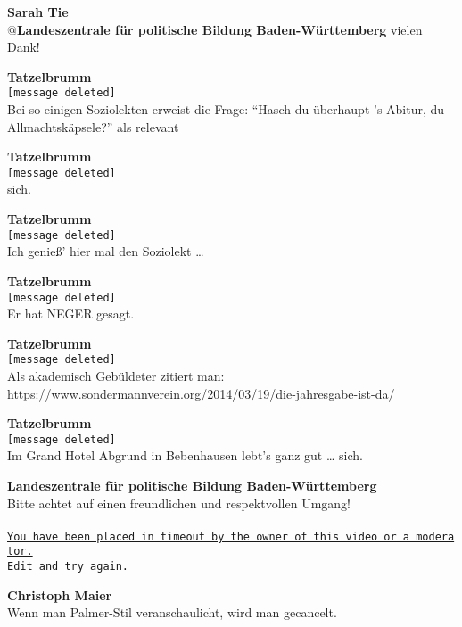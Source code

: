 \documentclass[]{article}
\let\oldparagraph\paragraph
\renewcommand{\paragraph}[1]{\oldparagraph{#1}\mbox{}}
\begin{document}
\textbf{Sarah Tie}\\
@\textbf{Landeszentrale für politische Bildung Baden-Württemberg} vielen
Dank!

\textbf{Tatzelbrumm}\\
\texttt{{[}message\ deleted{]}}\\
Bei so einigen Soziolekten\cite{soziolekt} erweist die
Frage: ``Hasch du überhaupt 's Abitur\cite{details}, du Allmachtskäpsele?''\cite{kaepsele} als relevant

\textbf{Tatzelbrumm}\\
\texttt{{[}message\ deleted{]}}\\
sich\cite{reflexivum}.

\textbf{Tatzelbrumm}\\
\texttt{{[}message\ deleted{]}}\\
Ich genieß' hier mal den Soziolekt\cite{soziolekt}
\ldots{}

\textbf{Tatzelbrumm}\\
\texttt{{[}message\ deleted{]}}\\
Er hat NEGER gesagt.\cite{neger}

\textbf{Tatzelbrumm}\\
\texttt{{[}message\ deleted{]}}\\
Als akademisch Gebüldeter zitiert man:\\
https://www.sondermannverein.org/2014/03/19/die-jahresgabe-ist-da/\cite{sondermann}

\textbf{Tatzelbrumm}\\
\texttt{{[}message\ deleted{]}}\\
Im Grand Hotel Abgrund\cite{grandhotelabgrund} in
Bebenhausen lebt's ganz gut \ldots{}
sich\cite{reflexivum}.

\textbf{Landeszentrale für politische Bildung Baden-Württemberg}\\
Bitte achtet auf einen freundlichen und respektvollen Umgang!

\paragraph{\label{timeout}}
\href{https://youtu.be/jSiCjzEgx1k?t=23}{\texttt{You\ have\ been\ placed\ in\ timeout\ by\ the\ owner\ of\ this\ video\ or\ a\ moderator.}}\\
\texttt{Edit\ and\ try\ again.}

\textbf{Christoph Maier}\\
Wenn man Palmer-Stil veranschaulicht, wird man gecancelt.
\end{document}
